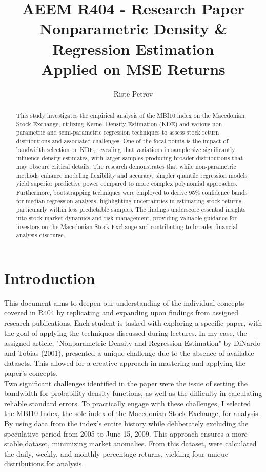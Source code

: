 \documentclass[]{article}
\title{AEEM R404 - Research Paper \\
	Nonparametric Density \& \\
	Regression Estimation\\
	Applied on MSE Returns}
\author{Riste Petrov}
\begin{document}
	
	\maketitle
	
	\begin{abstract}
		This study investigates the empirical analysis of the MBI10 index on the Macedonian Stock Exchange, utilizing Kernel Density Estimation (KDE) and various non-parametric and semi-parametric regression techniques to assess stock return distributions and associated challenges. One of the focal points is the impact of bandwidth selection on KDE, revealing that variations in sample size significantly influence density estimates, with larger samples producing broader distributions that may obscure critical details. The research demonstrates that while non-parametric methods enhance modeling flexibility and accuracy, simpler quantile regression models yield superior predictive power compared to more complex polynomial approaches. Furthermore, bootstrapping techniques were employed to derive 95\% confidence bands for median regression analysis, highlighting uncertainties in estimating stock returns, particularly within less predictable samples. The findings underscore essential insights into stock market dynamics and risk management, providing valuable guidance for investors on the Macedonian Stock Exchange and contributing to broader financial analysis discourse.
	\end{abstract}
	
	\tableofcontents
	\newpage
	
	\section{Introduction}
	This document aims to deepen our understanding of the individual concepts covered in R404 by replicating and expanding upon findings from assigned research publications. Each student is tasked with exploring a specific paper, with the goal of applying the techniques discussed during lectures. In my case, the assigned article, "Nonparametric Density and Regression Estimation" by DiNardo and Tobias (2001), presented a unique challenge due to the absence of available datasets. This allowed for a creative approach in mastering and applying the paper's concepts.\\
	
	
	Two significant challenges identified in the paper were the issue of setting the bandwidth for probability density functions, as well as the difficulty in calculating reliable standard errors. To practically engage with these challenges, I selected the MBI10 Index, the sole index of the Macedonian Stock Exchange, for analysis. By using data from the index's entire history while deliberately excluding the speculative period from 2005 to June 15, 2009. This approach ensures a more stable dataset, minimizing market anomalies. From this dataset, were calculated the daily, weekly, and monthly percentage returns, yielding four unique distributions for analysis.\\
	
\end{document}
